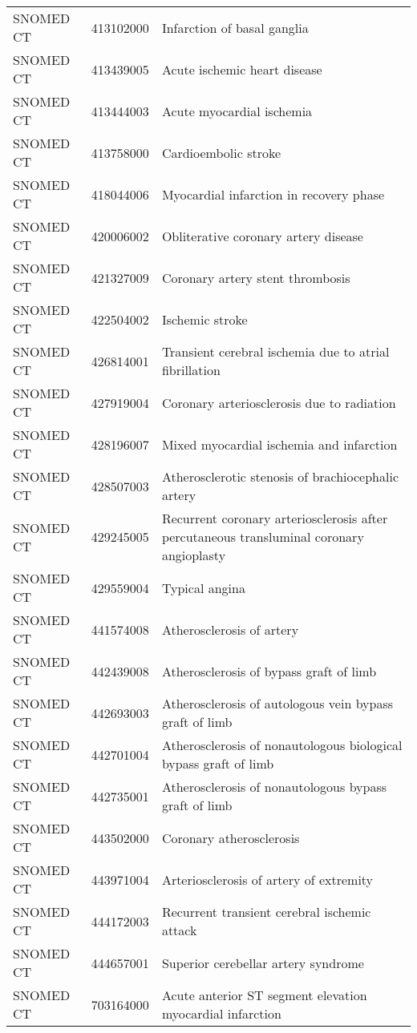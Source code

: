 \begin{longtable}{p{}p{}p{}}
  SNOMED CT & 413102000 & Infarction of basal ganglia \\ 
  SNOMED CT & 413439005 & Acute ischemic heart disease \\ 
  SNOMED CT & 413444003 & Acute myocardial ischemia \\ 
  SNOMED CT & 413758000 & Cardioembolic stroke \\ 
  SNOMED CT & 418044006 & Myocardial infarction in recovery phase \\ 
  SNOMED CT & 420006002 & Obliterative coronary artery disease \\ 
  SNOMED CT & 421327009 & Coronary artery stent thrombosis \\ 
  SNOMED CT & 422504002 & Ischemic stroke \\ 
  SNOMED CT & 426814001 & Transient cerebral ischemia due to atrial fibrillation \\ 
  SNOMED CT & 427919004 & Coronary arteriosclerosis due to radiation \\ 
  SNOMED CT & 428196007 & Mixed myocardial ischemia and infarction \\ 
  SNOMED CT & 428507003 & Atherosclerotic stenosis of brachiocephalic artery \\ 
  SNOMED CT & 429245005 & Recurrent coronary arteriosclerosis after percutaneous transluminal coronary angioplasty \\ 
  SNOMED CT & 429559004 & Typical angina \\ 
  SNOMED CT & 441574008 & Atherosclerosis of artery \\ 
  SNOMED CT & 442439008 & Atherosclerosis of bypass graft of limb \\ 
  SNOMED CT & 442693003 & Atherosclerosis of autologous vein bypass graft of limb \\ 
  SNOMED CT & 442701004 & Atherosclerosis of nonautologous biological bypass graft of limb \\ 
  SNOMED CT & 442735001 & Atherosclerosis of nonautologous bypass graft of limb \\ 
  SNOMED CT & 443502000 & Coronary atherosclerosis \\ 
  SNOMED CT & 443971004 & Arteriosclerosis of artery of extremity \\ 
  SNOMED CT & 444172003 & Recurrent transient cerebral ischemic attack \\ 
  SNOMED CT & 444657001 & Superior cerebellar artery syndrome \\ 
  SNOMED CT & 703164000 & Acute anterior ST segment elevation myocardial infarction \\ 

\end{longtable}
